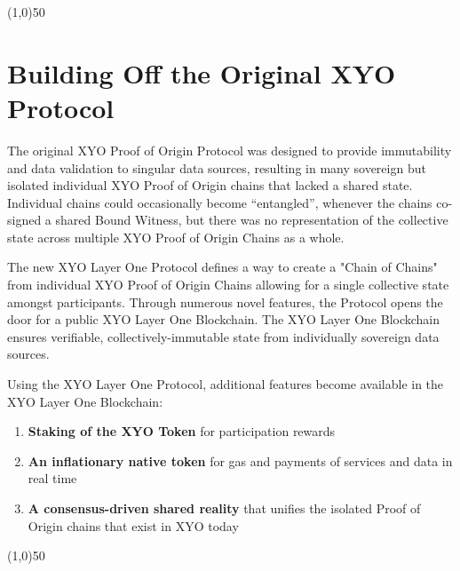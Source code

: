 \documentclass{article}
\begin{document}
\begin{center}
    \line(1,0){50}
\end{center}

\section{Building Off the Original XYO Protocol}
The original XYO Proof of Origin Protocol was designed to provide immutability
and data validation to singular data sources, resulting in many sovereign but
isolated individual XYO Proof of Origin chains that lacked a shared state.
Individual chains could occasionally become “entangled”, whenever the chains
co-signed a shared Bound Witness, but there was no representation of the
collective state across multiple XYO Proof of Origin Chains as a whole.

The new XYO Layer One Protocol defines a way to create a "Chain of Chains" from
individual XYO Proof of Origin Chains allowing for a single collective state
amongst participants. Through numerous novel features, the Protocol opens the
door for a public XYO Layer One Blockchain. The XYO Layer One Blockchain
ensures verifiable, collectively-immutable state from individually sovereign
data sources.

Using the XYO Layer One Protocol, additional features become available in the
XYO Layer One Blockchain:
\begin{enumerate}
    \item \textbf{Staking of the XYO Token} for participation rewards
    \item \textbf{An inflationary native token} for gas and payments of services and data in real time
    \item \textbf{A consensus-driven shared reality} that unifies the isolated Proof of Origin chains that exist in XYO today
\end{enumerate}

\begin{center}
    \line(1,0){50}
\end{center}
\end{document}

